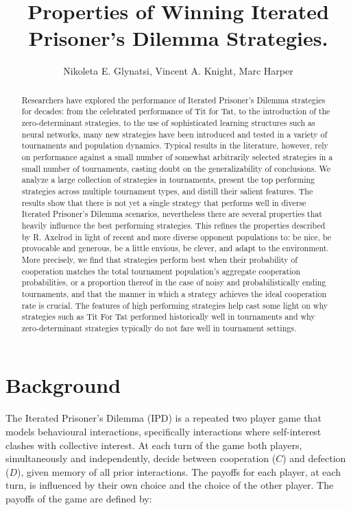\documentclass{article}
\title{Properties of Winning Iterated Prisoner's Dilemma Strategies.}
\author{Nikoleta E. Glynatsi, Vincent A. Knight, Marc Harper}
\date{}
\newcommand{\numberofalltournaments}{}
\newcommand{\numberofstrategies}{}
\begin{document}
\maketitle

\begin{abstract}
Researchers have explored the performance of Iterated Prisoner's Dilemma strategies
for decades: from the celebrated performance of Tit for Tat, to the
introduction of the zero-determinant strategies, to the use of sophisticated learning
structures such as neural networks, many new strategies have been introduced and tested
in a variety of tournaments and population dynamics. Typical results in the literature,
however, rely on performance against a small number of somewhat arbitrarily selected
strategies in a small number of tournaments, casting doubt on the generalizability
of conclusions. We analyze a large collection of \numberofstrategies
strategies in \numberofalltournaments tournaments, present the top performing strategies across multiple
tournament types, and distill their salient features.
The results show that there is not yet a single
strategy that performs well in diverse Iterated Prisoner's Dilemma scenarios,
nevertheless there are several properties that heavily influence the best performing
strategies. This refines the properties described by R. Axelrod in light of
recent and more diverse opponent populations to: be nice, be provocable and generous,
be a little envious, be clever, and adapt to the environment. More precisely,
we find that strategies perform best when their probability of cooperation
matches the total tournament population's aggregate cooperation probabilities,
or a proportion thereof in the case of noisy and probabilistically ending tournaments,
and that the manner in which a strategy achieves the ideal cooperation rate is crucial.
The features of high performing strategies help cast some light on why strategies such as Tit For Tat
performed historically well in tournaments and why zero-determinant strategies
typically do not fare well in tournament settings.
\end{abstract}

\section{Background}

The Iterated Prisoner's Dilemma (IPD) is a repeated two player game that models
behavioural interactions, specifically interactions where
self-interest clashes with collective interest. At each turn of the game both
players, simultaneously and independently, decide between cooperation (\(C\)) and
defection (\(D\)), given memory of all prior interactions. The payoffs for each
player, at each turn, is influenced by their own choice and the choice of the
other player. The payoffs of the game are defined by:
\end{document}
